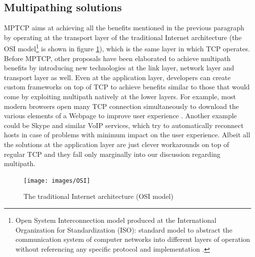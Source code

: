 \subsection{Multipathing solutions}
\label{mptcp_alternatives}
MPTCP aims at achieving all the benefits mentioned in the previous paragraph by operating at the transport layer of the traditional Internet architecture (the OSI model\footnote{Open System Interconnection model produced at the International Organization for Standardization (ISO): standard model to abstract the communication system of computer networks into different layers of operation without referencing any specific protocol and implementation \cite{osi}.} is shown in figure \ref{fig:OSI}), which is the same layer in which TCP operates.
Before MPTCP, other proposals have been elaborated to achieve multipath benefits by introducing new technologies at the link layer, network layer and transport layer as well. Even at the application layer, developers can create custom frameworks on top of TCP to achieve benefits similar to those that would come by exploiting multipath natively at the lower layers. For example, most modern browsers open many TCP connection simultaneously to download the various elements of a Webpage to improve user experience \cite{Yuchung}. Another example could be Skype and similar VoIP services, which try to automatically reconnect hosts in case of problems with minimum impact on the user experience. Albeit all the solutions at the application layer are just clever workarounds on top of regular TCP and they fall only marginally into our discussion regarding multipath.

\begin{figure}[!htb]
\centering
\texttt{[image: images/OSI]}
\caption{The traditional Internet architecture (OSI model)}
\label{fig:OSI}
\end{figure}

